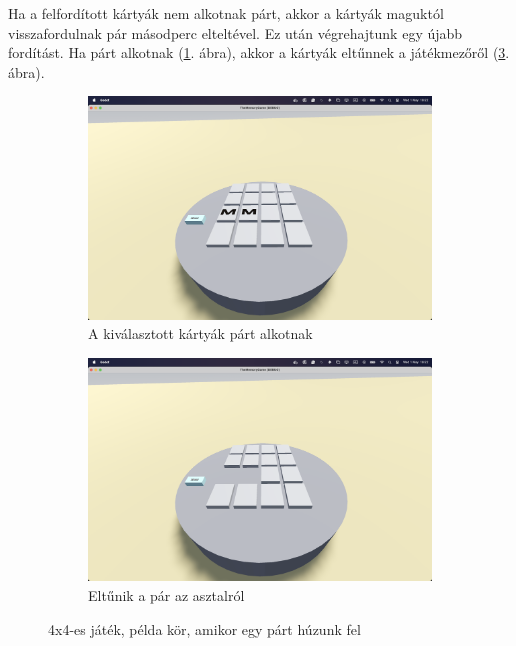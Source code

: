 Ha a felfordított kártyák nem alkotnak párt, akkor a kártyák maguktól visszafordulnak pár másodperc elteltével. Ez után végrehajtunk egy újabb fordítást.
Ha párt alkotnak (\ref{img:pair}. ábra), akkor a kártyák eltűnnek a játékmezőről  (\ref{img:pair_gone}. ábra).
\begin{figure}[H]
    \begin{subfigure}[ct]{0.5\textwidth}
        \includegraphics[width=\textwidth]{img/asztal_4x4_pair.png}
        \caption{A kiválasztott kártyák párt alkotnak}
        \label{img:pair}
    \end{subfigure}
    \begin{subfigure}[ct]{0.5\textwidth}
        \includegraphics[width=\textwidth]{img/asztal_4x4_pair_eltunik.png}
        \caption{Eltűnik a pár az asztalról}
        \label{img:pair_gone}
    \end{subfigure}
    \caption{4x4-es játék, példa kör, amikor egy párt húzunk fel}
\end{figure}


